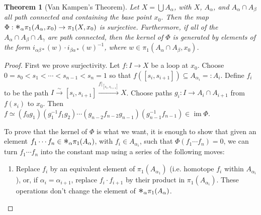 \documentclass[12pt]{article}
\theoremstyle{plain}
\newtheorem{theorem}[equation]{Theorem}
\theoremstyle{definition}
\theoremstyle{remark}
\newcommand{\bigast}{\text{\Large $\ast$}}
\DeclareMathOperator{\im}{im}
\begin{document}
 \begin{theorem}[Van Kampen's Theorem]
   Let $X=\bigcup A_\alpha$, with $X$, $A_\alpha$, and $A_\alpha\cap A_\beta$ all path
   connected and containing the base point $x_0$. Then the map $\Phi:\bigast_\alpha
   \pi_1(A_\alpha,x_0)\to \pi_1(X,x_0)$ is surjective. Furthermore, if all of the
   $A_\alpha\cap A_\beta\cap A_\gamma$ are path connected, then the kernel of $\Phi$ is
   generated by elements of the form $i_{\alpha \beta *}(w)\cdot i_{\beta\alpha
   *}(w)^{-1}$, where $w\in \pi_1(A_\alpha\cap A_\beta,x_0)$.
 \end{theorem}
 \begin{proof}
   First we prove surjectivity. Let $f:I\to X$ be a loop at $x_0$. Choose $0=s_0<
   s_1<\cdots < s_{n-1}< s_n=1$ so that $f([s_i,s_{i+1}])\subseteq A_{\alpha_i}=:A_i$.
   Define $f_i$ to be the path $I\xrightarrow{\sim} [s_i,s_{i+1}]
   \xrightarrow{f|_{[s_i,s_{i+1}]}} X$. Choose paths $g_i:I\to A_i\cap A_{i+1}$ from
   $f(s_i)$ to $x_0$. Then $f\simeq (f_0 g_1)(g_1^{-1}f_1g_2)\cdots (g_{n-2} f_{n-2}
   g_{n-1}) (g_{n-1}^{-1} f_{n-1})\in \im \Phi$.

   To prove that the kernel of $\Phi$ is what we want, it is enough to show that given an
   element $f_1\cdots f_n\in \bigast_\alpha \pi_1(A_\alpha)$, with $f_i\in A_{\alpha_i}$,
   such that $\Phi(f_1\cdots f_n)=0$, we can turn $f_1\cdots f_n$ into the constant map
   using a series of the following moves:
   \begin{enumerate}
     \item Replace $f_i$ by an equivalent element of $\pi_1(A_{\alpha_1})$ (i.e. homotope
     $f_i$ within $A_{\alpha_i}$), or, if $\alpha_i=\alpha_{i+1}$, replace $f_i\cdot
     f_{i+1}$ by their product in $\pi_1(A_{\alpha_i})$. These operations don't change
     the element of $\bigast_\alpha \pi_1(A_\alpha)$.


\end{enumerate}
\end{proof}
\end{document}
